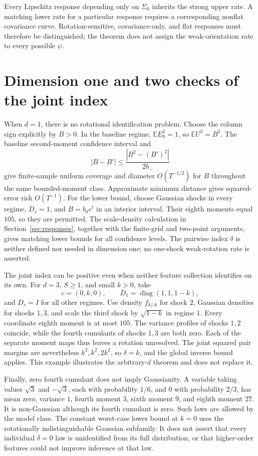 \documentclass[11pt,a4paper]{article}
\numberwithin{equation}{section}
\newcommand{\E}{\mathbb E}
\DeclareMathOperator{\diag}{diag}
\begin{document}
Every Lipschitz response depending only on \(\Sigma_0\) inherits the
strong upper rate. A matching lower rate for a particular response
requires a corresponding nonflat covariance curve.
Rotation-sensitive, covariance-only, and flat responses must therefore
be distinguished; the theorem does not assign the weak-orientation rate
to every possible \(\psi\).

\section{Dimension one and two checks of the joint index}\label{sec:checks}
When \(d=1\), there is no rotational identification problem.
Choose the column sign explicitly by \(B>0\).
In the baseline regime, \(\E E_0^2=1\), so \(\E U^2=B^2\).
The baseline second-moment confidence interval and
\[
 |B-B'|\le\frac{|B^2-(B')^2|}{2b_-}
\]
give finite-sample uniform coverage and diameter \(O(T^{-1/2})\)
for \(B\) throughout the same bounded-moment class.
Approximate minimum distance gives squared-error risk \(O(T^{-1})\).
For the lower bound, choose Gaussian shocks in every regime, \(D_s=1\),
and \(B=b_0e^t\) in an interior interval.
Their eighth moments equal \(105\), so they are permitted.
The scale-density calculation in Section~\ref{sec:responses}, together
with the finite-grid and two-point arguments, gives matching lower
bounds for all confidence levels.
The pairwise index \(\delta\) is neither defined nor needed in dimension
one; no one-shock weak-rotation rate is asserted.

The joint index can be positive even when neither feature collection
identifies on its own. For \(d=3\), \(S\ge1\), and small \(k>0\), take
\[
 c=(0,k,0),\qquad D_1=\diag(1,1,1-k),
\]
and \(D_s=I\) for all other regimes.
Use density \(f_{k/A}\) for shock \(2\), Gaussian densities for shocks
\(1,3\), and scale the third shock by \(\sqrt{1-k}\) in regime \(1\).
Every coordinate eighth moment is at most \(105\).
The variance profiles of shocks \(1,2\) coincide, while the fourth
cumulants of shocks \(1,3\) are both zero.
Each of the separate moment maps thus leaves a rotation unresolved.
The joint squared pair margins are nevertheless \(k^2,k^2,2k^2\), so
\(\delta=k\), and the global inverse bound applies.
This example illustrates the arbitrary-\(d\) theorem and does not
replace it.

Finally, zero fourth cumulant does not imply Gaussianity.
A variable taking values \(\sqrt3\) and \(-\sqrt3\), each with
probability \(1/6\), and \(0\) with probability \(2/3\), has mean zero,
variance \(1\), fourth moment \(3\), sixth moment \(9\), and eighth
moment \(27\). It is non-Gaussian although its fourth cumulant is zero.
Such laws are allowed by the model class.
The constant worst-case lower bound at \(k=0\) uses the rotationally
indistinguishable Gaussian subfamily. It does not assert that every
individual \(\delta=0\) law is unidentified from its full distribution,
or that higher-order features could not improve inference at that law.
\end{document}
